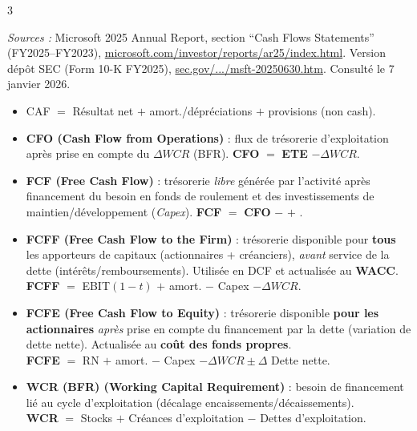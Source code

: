\documentclass[10pt,landscape]{article}
\begin{document}
\begin{multicols}{3}
    \begin{flushleft}
        \footnotesize\textit{Sources :}
        Microsoft 2025 Annual Report, section “Cash Flows Statements” (FY2025--FY2023),
        \href{https://www.microsoft.com/investor/reports/ar25/index.html}{microsoft.com/investor/reports/ar25/index.html}.
        Version dépôt SEC (Form 10-K FY2025),
        \href{https://www.sec.gov/Archives/edgar/data/789019/000095017025100235/msft-20250630.htm}{sec.gov/.../msft-20250630.htm}.
        Consulté le 7 janvier 2026.
    \end{flushleft}

    \begin{itemize}[leftmargin=3.5mm,itemsep=0.2mm]
        \item CAF $=$ Résultat net $+$ amort./dépréciations $+$ provisions (non cash).
        \item \textbf{CFO (Cash Flow from Operations)} : flux de trésorerie d’exploitation après prise en compte du $\Delta WCR$ (BFR).
              \hspace*{3.5mm}\textbf{CFO} $=$ \textbf{ETE} $-\Delta WCR$.
        \item \textbf{FCF (Free Cash Flow)} : trésorerie \emph{libre} générée par l’activité après financement du besoin en fonds de roulement et des investissements
              de maintien/développement (\textit{Capex}).
              \hspace*{3.5mm}\textbf{FCF} $=$ \textbf{CFO} $-$  $+$ .
        \item \textbf{FCFF (Free Cash Flow to the Firm)} : trésorerie disponible pour \textbf{tous} les apporteurs de capitaux (actionnaires + créanciers),
              \textit{avant} service de la dette (intérêts/remboursements). Utilisée en DCF et actualisée au \textbf{WACC}.\\
              \hspace*{3.5mm}\textbf{FCFF} $=$ EBIT$(1{-}t)$ $+$ amort. $-$ Capex $-\Delta WCR$.
        \item \textbf{FCFE (Free Cash Flow to Equity)} : trésorerie disponible \textbf{pour les actionnaires} \textit{après} prise en compte du financement par la dette
              (variation de dette nette). Actualisée au \textbf{coût des fonds propres}.\\
              \hspace*{3.5mm}\textbf{FCFE} $=$ RN $+$ amort. $-$ Capex $-\Delta WCR \pm \Delta$ Dette nette.

        \item \textbf{WCR (BFR) (Working Capital Requirement)} : besoin de financement lié au cycle d’exploitation (décalage encaissements/décaissements).\\
              \hspace*{3.5mm}\textbf{WCR} $=$ Stocks $+$ Créances d’exploitation $-$ Dettes d’exploitation.


\end{itemize}
\end{multicols}
\end{document}
